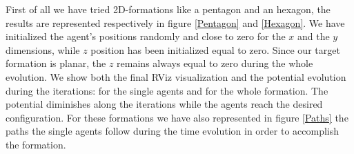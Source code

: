 \documentclass[a4paper,11pt,oneside]{book}
\begin{document}
First of all we have tried 2D-formations like a pentagon and an hexagon, the results are represented respectively in figure \ref{Pentagon} and \ref{Hexagon}. We have initialized the agent's positions randomly and close to zero for the $x$ and the $y$ dimensions, while $z$ position has been initialized equal to zero. Since our target formation is planar, the $z$ remains always equal to zero during the whole evolution.
We show both the final RViz visualization and the potential evolution during the iterations: for the single agents and for the whole formation. The potential diminishes along the iterations while the agents reach the desired configuration. 
For these formations we have also represented in figure \ref{Paths} the paths the single agents follow during the time evolution in order to accomplish the formation.
\end{document}
